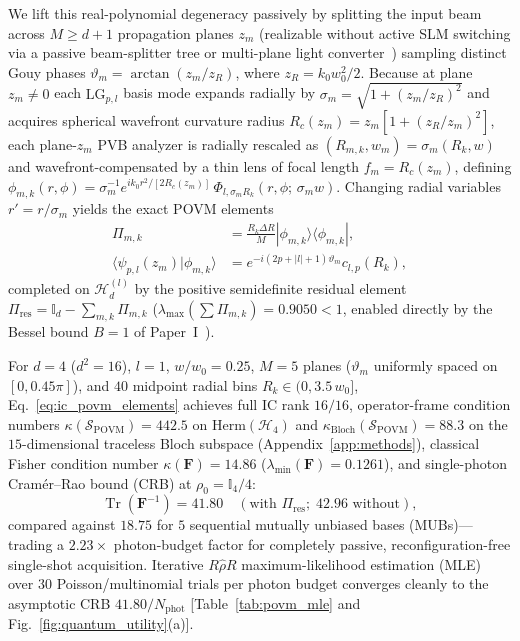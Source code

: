 \documentclass[aps,pra,onecolumn,notitlepage,11pt,tightenlines,nofootinbib,floatfix,longbibliography]{revtex4-2}
\newcommand{\braket}[2]{\langle #1 | #2 \rangle}
\newcommand{\ket}[1]{| #1 \rangle}
\newcommand{\bra}[1]{\langle #1 |}
\newcommand{\abs}[1]{\lvert #1 \rvert}
\begin{document}
We lift this real-polynomial degeneracy passively by splitting the input beam across $M \ge d+1$ propagation planes $z_m$ (realizable without active SLM switching via a passive beam-splitter tree or multi-plane light converter~\cite{Fontaine2019,Bouchard2018}) sampling distinct Gouy phases $\vartheta_m = \arctan(z_m/z_R)$, where $z_R = k_0 w_0^2/2$. Because at plane $z_m \neq 0$ each $\mathrm{LG}_{p,l}$ basis mode expands radially by $\sigma_m = \sqrt{1 + (z_m/z_R)^2}$ and acquires spherical wavefront curvature radius $R_c(z_m) = z_m[1 + (z_R/z_m)^2]$, each plane-$z_m$ PVB analyzer is radially rescaled as $(R_{m,k}, w_m) = \sigma_m(R_k, w)$ and wavefront-compensated by a thin lens of focal length $f_m = R_c(z_m)$, defining $\phi_{m,k}(r,\phi) = \sigma_m^{-1} e^{ik_0 r^2/[2R_c(z_m)]}\,\Phi_{l,\sigma_m R_k}(r,\phi;\,\sigma_m w)$. Changing radial variables $r' = r/\sigma_m$ yields the exact POVM elements~\cite{Renes2004}
\begin{align}
\Pi_{m,k} &= \frac{R_k \Delta R}{M}\ket{\phi_{m,k}}\bra{\phi_{m,k}}, \nonumber \\
\braket{\psi_{p,l}(z_m)}{\phi_{m,k}} &= e^{-i(2p+\abs{l}+1)\vartheta_m} c_{l,p}(R_k),
\label{eq:ic_povm_elements}
\end{align}
completed on $\mathcal{H}_d^{(l)}$ by the positive semidefinite residual element $\Pi_{\mathrm{res}} = \mathbb{I}_d - \sum_{m,k}\Pi_{m,k}$ ($\lambda_{\max}(\sum \Pi_{m,k}) = 0.9050 < 1$, enabled directly by the Bessel bound $B = 1$ of Paper~I~\cite{AyalaPaperI}).

For $d = 4$ ($d^2 = 16$), $l = 1$, $w/w_0 = 0.25$, $M = 5$ planes ($\vartheta_m$ uniformly spaced on $[0, 0.45\pi]$), and $40$ midpoint radial bins $R_k \in (0, 3.5\,w_0]$, Eq.~\eqref{eq:ic_povm_elements} achieves full IC rank $16/16$, operator-frame condition numbers $\kappa(\mathcal{S}_{\mathrm{POVM}}) = 442.5$ on $\mathrm{Herm}(\mathcal{H}_4)$ and $\kappa_{\mathrm{Bloch}}(\mathcal{S}_{\mathrm{POVM}}) = 88.3$ on the $15$-dimensional traceless Bloch subspace (Appendix~\ref{app:methods}), classical Fisher condition number $\kappa(\mathbf{F}) = 14.86$ ($\lambda_{\min}(\mathbf{F}) = 0.1261$), and single-photon Cram\'er--Rao bound (CRB) at $\rho_0 = \mathbb{I}_4/4$:
\begin{equation}
\operatorname{Tr}\!\left(\mathbf{F}^{-1}\right) = 41.80 \quad (\text{with }\Pi_{\mathrm{res}};\; 42.96\text{ without}),
\label{eq:fisher_crb}
\end{equation}
compared against $18.75$ for $5$ sequential mutually unbiased bases (MUBs)---trading a $2.23\times$ photon-budget factor for completely passive, reconfiguration-free single-shot acquisition. Iterative $R\hat{\rho}R$ maximum-likelihood estimation (MLE)~\cite{Lvovsky2004} over $30$ Poisson/multinomial trials per photon budget converges cleanly to the asymptotic CRB $41.80/N_{\mathrm{phot}}$ [Table~\ref{tab:povm_mle} and Fig.~\ref{fig:quantum_utility}(a)].
\end{document}
